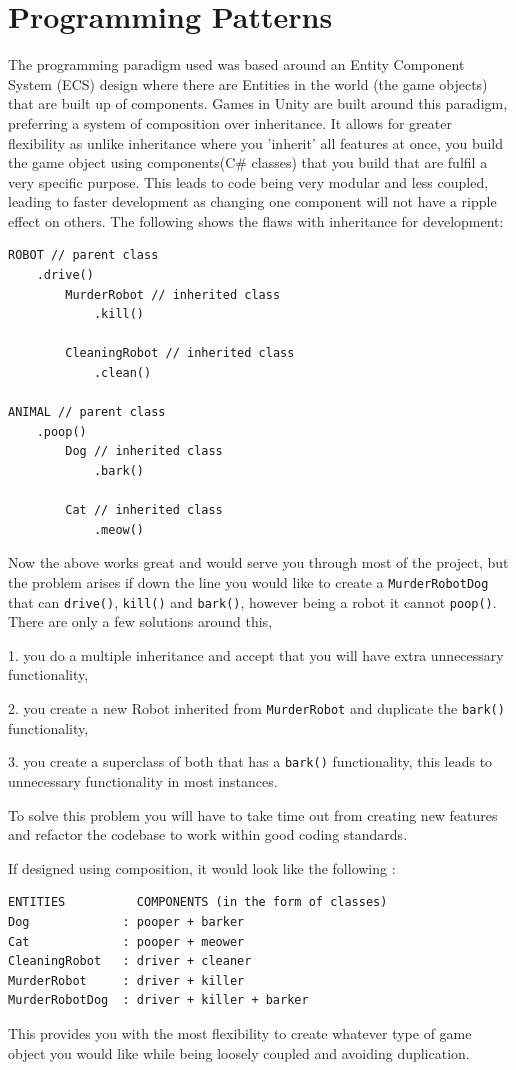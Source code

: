\documentclass[12pt]{report}
\begin{document}
\section{Programming Patterns}
The programming paradigm used was based around an Entity Component System (ECS) design where there are Entities in the world (the game objects) that are built up of components.
Games in Unity are built around this paradigm, preferring a system of composition over inheritance. It allows for greater flexibility as unlike inheritance where you 'inherit' all features at once, you build the game object using components(C\# classes) that you build that are fulfil a very specific purpose. This leads to code being very modular and less coupled, leading to faster development as changing one component will not have a ripple effect on others. 
The following shows the flaws with inheritance for development\cite{CompOverInherit}:
\begin{lstlisting}
ROBOT // parent class
    .drive()
        MurderRobot // inherited class
            .kill()
        
        CleaningRobot // inherited class
            .clean()

ANIMAL // parent class
    .poop()
        Dog // inherited class
            .bark()

        Cat // inherited class
            .meow()
\end{lstlisting}
Now the above works great and would serve you through most of the project, but the problem arises if down the line you would like to create a \lstinline{MurderRobotDog} that can \lstinline{drive()}, \lstinline{kill()} and \lstinline{bark()}, however being a robot it cannot  \lstinline{poop()}. There are only a few solutions around this, 

1. you do a multiple inheritance and accept that you will have extra unnecessary functionality, 

2. you create a new Robot inherited from  \lstinline{MurderRobot} and duplicate the  \lstinline{bark()} functionality, 

3. you create a superclass of both that has a  \lstinline{bark()} functionality, this leads to unnecessary functionality in most instances. 

To solve this problem you will have to take time out from creating new features and refactor the codebase to work within good coding standards\cite{codingPractices}.

If designed using composition, it would look like the following \cite{CompOverInherit}:
\begin{Verbatim}[frame=single]
ENTITIES          COMPONENTS (in the form of classes)
Dog             : pooper + barker
Cat             : pooper + meower
CleaningRobot   : driver + cleaner
MurderRobot     : driver + killer
MurderRobotDog  : driver + killer + barker
\end{Verbatim}
This provides you with the most flexibility to create whatever type of game object you would like while being loosely coupled and avoiding duplication.
\end{document}
